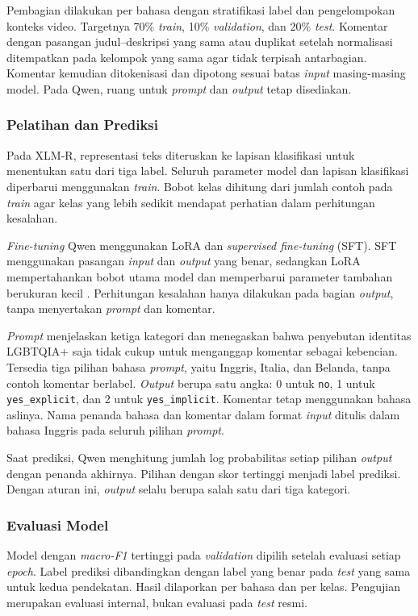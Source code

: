 \documentclass[11pt]{article}
\begin{document}
Pembagian dilakukan per bahasa dengan stratifikasi label dan pengelompokan konteks video. Targetnya 70\% \textit{train}, 10\% \textit{validation}, dan 20\% \textit{test}. Komentar dengan pasangan judul--deskripsi yang sama atau duplikat setelah normalisasi ditempatkan pada kelompok yang sama agar tidak terpisah antarbagian. Komentar kemudian ditokenisasi dan dipotong sesuai batas \textit{input} masing-masing model. Pada Qwen, ruang untuk \textit{prompt} dan \textit{output} tetap disediakan.

\subsubsection{Pelatihan dan Prediksi}
Pada XLM-R, representasi teks diteruskan ke lapisan klasifikasi untuk menentukan satu dari tiga label. Seluruh parameter model dan lapisan klasifikasi diperbarui menggunakan \textit{train}. Bobot kelas dihitung dari jumlah contoh pada \textit{train} agar kelas yang lebih sedikit mendapat perhatian dalam perhitungan kesalahan.

\textit{Fine-tuning} Qwen menggunakan LoRA dan \textit{supervised fine-tuning} (SFT). SFT menggunakan pasangan \textit{input} dan \textit{output} yang benar, sedangkan LoRA mempertahankan bobot utama model dan memperbarui parameter tambahan berukuran kecil \citep{hu-etal-2021-lora}. Perhitungan kesalahan hanya dilakukan pada bagian \textit{output}, tanpa menyertakan \textit{prompt} dan komentar.

\textit{Prompt} menjelaskan ketiga kategori dan menegaskan bahwa penyebutan identitas LGBTQIA+ saja tidak cukup untuk menganggap komentar sebagai kebencian. Tersedia tiga pilihan bahasa \textit{prompt}, yaitu Inggris, Italia, dan Belanda, tanpa contoh komentar berlabel. \textit{Output} berupa satu angka: 0 untuk \texttt{no}, 1 untuk \texttt{yes\_explicit}, dan 2 untuk \texttt{yes\_implicit}. Komentar tetap menggunakan bahasa aslinya. Nama penanda bahasa dan komentar dalam format \textit{input} ditulis dalam bahasa Inggris pada seluruh pilihan \textit{prompt}.

Saat prediksi, Qwen menghitung jumlah log probabilitas setiap pilihan \textit{output} dengan penanda akhirnya. Pilihan dengan skor tertinggi menjadi label prediksi. Dengan aturan ini, \textit{output} selalu berupa salah satu dari tiga kategori.

\subsubsection{Evaluasi Model}
Model dengan \textit{macro-F1} tertinggi pada \textit{validation} dipilih setelah evaluasi setiap \textit{epoch}. Label prediksi dibandingkan dengan label yang benar pada \textit{test} yang sama untuk kedua pendekatan. Hasil dilaporkan per bahasa dan per kelas. Pengujian merupakan evaluasi internal, bukan evaluasi pada \textit{test} resmi.
\end{document}
